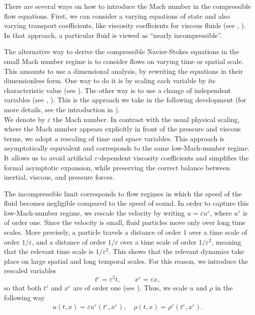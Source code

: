 \documentclass[11pt, twoside, a4paper]{article}
\theoremstyle{plain}
\theoremstyle{remark}
\numberwithin{equation}{section}
\renewcommand{\epsilon}{\varepsilon}
\newcommand{\eps}{\varepsilon}
\begin{document}
There are several ways on how to introduce the Mach number in the compressible flow equations. First, we can consider a varying equations of state and also varying transport coefficients, like viscosity coefficients for viscous fluids (see \cite{ebin1977motion}, \cite{schochet1986compressible}). In that approach, a particular fluid is viewed as ``nearly incompressible''. 

The alternative way to derive the compressible Navier-Stokes equations in the small Mach number regime is to consider flows on varying time or spatial scale. This amounts to use a dimensional analysis, by rewriting the equations in their dimensionless form. One way to do it is by scaling each variable by its characteristic value (see \cite{klein2001asymptotic}). The other way is to use a change of independent variables (see \cite{alazard2006low}, \cite{lions1998incompressible}). This is the approach we take in the following development (for more details, see the introduction in \cite{lions1996mathematical}).\\

We denote by $\eps$ the Mach number. In contrast with the usual physical scaling, where the Mach number appears explicitly in front of the pressure and viscous terms, we adopt a rescaling of time and space variables. This approach is asymptotically equivalent and corresponds to the same low-Mach-number regime. It allows us to avoid artificial $\eps$-dependent viscosity coefficients and simplifies the formal asymptotic expansion, while preserving the correct balance between inertial, viscous, and pressure forces.

The incompressible limit corresponds to flow regimes in which the speed of the fluid becomes negligible compared to the speed of sound. In order to capture this low-Mach-number regime, we rescale the velocity by writing $u = \epsilon u^\epsilon$, where $u^\epsilon$ is of order one. Since the velocity is small, fluid particles move only over long time scales. More precisely, a particle travels a distance of order $1$ over a time scale of order $1/\epsilon$, and a distance of order $1/\epsilon$ over a time scale of order $1/\epsilon^2$, meaning that the relevant time scale is $1/\eps^2$. This shows that the relevant dynamics take place on large spatial and long temporal scales. For this reason, we introduce the rescaled variables
\[
t^\epsilon = \epsilon^2 t, \qquad x^\epsilon = \epsilon x,
\]
so that both $t^\epsilon$ and $x^\epsilon$ are of order one (see \cite{danchin2005low}). Thus, we scale $u$ and $\rho$ in the following way
\begin{align}
    u(t,x) = \eps u^\eps(t^\eps,x^\eps), \quad  \rho(t,x) = \rho^\eps(t^\eps,x^\eps).\label{changevar}
\end{align}
\end{document}
